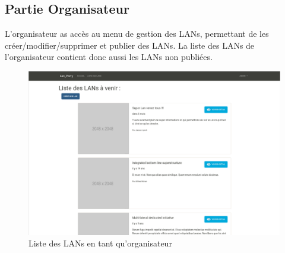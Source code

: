\documentclass[12pt]{article}
\begin{document}
\subsection{Partie Organisateur}

L'organisateur as accès au menu de gestion des LANs, permettant de les créer/modifier/supprimer et publier des LANs. La liste des LANs de l'organisateur contient donc aussi les LANs non publiées.

\begin{figure}[H]
\centering
\includegraphics[scale=0.20]{images/liste_orga.png}
\caption{Liste des LANs en tant qu'organisateur}
\label{}
\end{figure}
\end{document}
